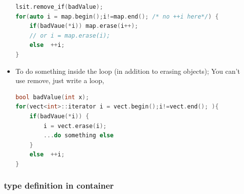\documentclass[a4paper,11pt,twoside]{book}
\begin{document}
\begin{itemize}
\begin{lstlisting}[frame=single, language=c++]
lsit.remove_if(badValue);
for(auto i = map.begin();i!=map.end(); /* no ++i here*/) {
	if(badVaue(*i)) map.erase(i++);
	// or i = map.erase(i);
	else  ++i;
}
\end{lstlisting}

\item  To do something inside the loop (in addition to erasing objects);  You can't use remove, just write a loop,
\begin{lstlisting}[frame=single, language=c++]
bool badValue(int x);
for(vect<int>::iterator i = vect.begin();i!=vect.end(); ){
	if(badVaue(*i)) {
		i = vect.erase(i);
		...do something else
	}
	else  ++i;
}
\end{lstlisting}

\end{itemize}
\subsubsection{type definition in container}
\end{document}
